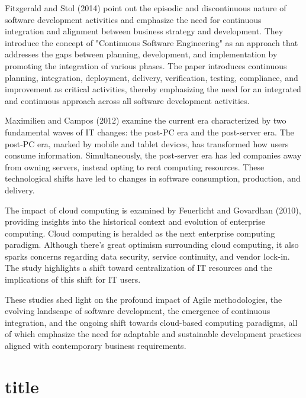 \documentclass[a4Paper]{article}
\begin{document}
Fitzgerald and Stol (2014)\cite{fitzgerald2014continuous} point out the episodic and discontinuous nature of software development activities and emphasize the need for continuous integration and alignment between business strategy and development. They introduce the concept of "Continuous Software Engineering" as an approach that addresses the gaps between planning, development, and implementation by promoting the integration of various phases. The paper introduces continuous planning, integration, deployment, delivery, verification, testing, compliance, and improvement as critical activities, thereby emphasizing the need for an integrated and continuous approach across all software development activities.

Maximilien and Campos (2012)\cite{maximilien2012facts} examine the current era characterized by two fundamental waves of IT changes: the post-PC era and the post-server era. The post-PC era, marked by mobile and tablet devices, has transformed how users consume information. Simultaneously, the post-server era has led companies away from owning servers, instead opting to rent computing resources. These technological shifts have led to changes in software consumption, production, and delivery.

The impact of cloud computing is examined by Feuerlicht and Govardhan (2010)\cite{feuerlicht2010impact}, providing insights into the historical context and evolution of enterprise computing. Cloud computing is heralded as the next enterprise computing paradigm. Although there's great optimism surrounding cloud computing, it also sparks concerns regarding data security, service continuity, and vendor lock-in. The study highlights a shift toward centralization of IT resources and the implications of this shift for IT users.

These studies shed light on the profound impact of Agile methodologies, the evolving landscape of software development, the emergence of continuous integration, and the ongoing shift towards cloud-based computing paradigms, all of which emphasize the need for adaptable and sustainable development practices aligned with contemporary business requirements.
\pagebreak
\section{title}
%

%
\end{document}
